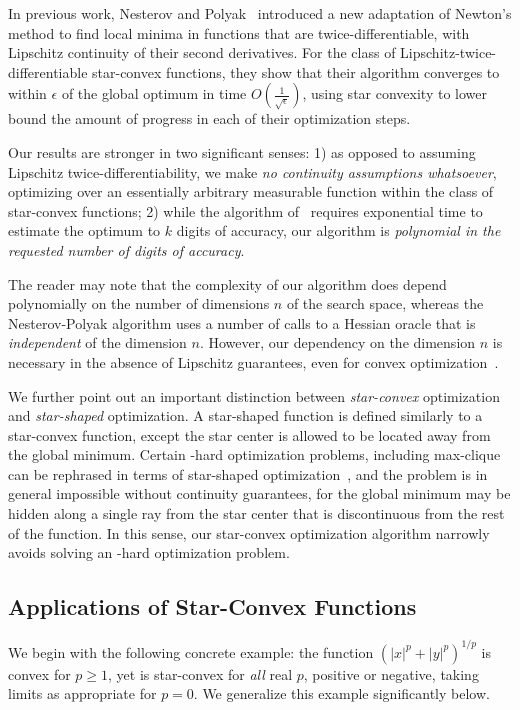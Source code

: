 \documentclass[11pt,letter]{article}
\newcommand{\ferr}{\epsilon}
\numberwithin{nTheorems}{section}
\begin{document}
In previous work, Nesterov and Polyak~\cite{Nesterov:2006} introduced a new adaptation of Newton's method to find local minima in functions that are twice-differentiable, with Lipschitz continuity of their second derivatives. For the class of Lipschitz-twice-differentiable star-convex functions, they show that their algorithm converges to within $\ferr$ of the global optimum in time $O(\frac{1}{\sqrt{\ferr}})$, using star convexity to lower bound the amount of progress in each of their optimization steps.

Our results are stronger in two significant senses: 1) as opposed to assuming Lipschitz twice-differentiability, we make \emph{no continuity assumptions whatsoever}, optimizing over an essentially arbitrary measurable function within the class of star-convex functions; 2) while the algorithm of~\cite{Nesterov:2006} requires exponential time to estimate the optimum to $k$ digits of accuracy, our algorithm is \emph{polynomial in the requested number of digits of accuracy}.

The reader may note that the complexity of our algorithm does depend polynomially on the number of dimensions $n$ of the search space, whereas the Nesterov-Polyak algorithm uses a number of calls to a Hessian oracle that is \emph{independent} of the dimension $n$.
However, our dependency on the dimension $n$ is necessary in the absence of Lipschitz guarantees, even for convex optimization~\cite{Nemirovskii:1983}.

We further point out an important distinction between \emph{star-convex} optimization and \emph{star-shaped} optimization.
A star-shaped function is defined similarly to a star-convex function, except the star center is allowed to be located away from the global minimum.
Certain \NP-hard optimization problems, including max-clique can be rephrased in terms of star-shaped optimization~\cite{MaxClique}, and the problem is in general impossible without continuity guarantees, for the global minimum may be hidden along a single ray from the star center that is discontinuous from the rest of the function. In this sense, our star-convex optimization algorithm narrowly avoids solving an \NP-hard optimization problem.

\subsection{Applications of Star-Convex Functions}

We begin with the following concrete example: the function $(|x|^p+|y|^p)^{1/p}$ is convex for $p\geq 1$, yet is star-convex for \emph{all} real $p$, positive or negative, taking limits as appropriate for $p=0$. We generalize this example significantly below.
\end{document}
